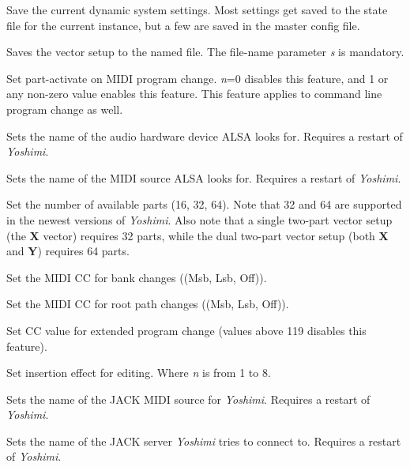       Save the current dynamic system settings.
      Most settings get saved to the state file for the current instance,
      but a few are saved in the master config file.

      Saves the vector setup to the named file.
      The file-name parameter \textsl{s} is mandatory.

      Set part-activate on MIDI program change.
      \textsl{n}=0 disables this feature, and
      1 or any non-zero value enables this feature.
      This feature applies to command line program change as well.

      Sets the name of the audio hardware device ALSA looks for.
      Requires a restart of \textsl{Yoshimi}.

      Sets the name of the MIDI source ALSA looks for.
      Requires a restart of \textsl{Yoshimi}.

      Set the number of available parts (16, 32, 64).
      Note that 32 and 64 are supported in the newest versions of
      \textsl{Yoshimi}.  Also note that a single two-part vector setup (the
      \textbf{X} vector) requires 32 parts, while the dual two-part vector
      setup (both \textbf{X} and \textbf{Y}) requires 64 parts.

      Set the MIDI CC for bank changes ((Msb, Lsb, Off)).

      Set the MIDI CC for root path changes ((Msb, Lsb, Off)).

      Set CC value for extended program change (values above 119 disables
      this feature).

      Set insertion effect for editing. Where \textsl{n} is from 1 to 8.

      Sets the name of the JACK MIDI source for \textsl{Yoshimi}.
      Requires a restart of \textsl{Yoshimi}.

      Sets the name of the JACK server \textsl{Yoshimi} tries to connect to.
      Requires a restart of \textsl{Yoshimi}.

